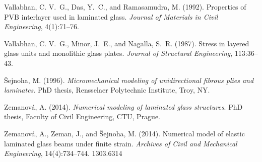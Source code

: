 \documentclass[11pt]{article}
\begin{document}
\begin{thebibliography}{10}
Vallabhan, C. V.~G., Das, Y.~C., and Ramasamudra, M. (1992).
Properties of {P}{V}{B} interlayer used in laminated glass.
{\em Journal of Materials in Civil Engineering}, 4(1):71--76.

Vallabhan, C. V.~G., Minor, J.~E., and Nagalla, S.~R. (1987).
Stress in layered glass units and monolithic glass plates.
{\em Journal of Structural Engineering}, 113:36--43.

\v{S}ejnoha, M. (1996).
{\em Micromechanical modeling of unidirectional fibrous plies and
  laminates}.
PhD thesis, Rensselaer Polytechnic Institute, Troy, NY.

Zemanov\'{a}, A. (2014).
{\em Numerical modeling of laminated glass structures}.
PhD thesis, Faculty of Civil Engineering, CTU, Prague.

Zemanov\'{a}, A., Zeman, J., and \v{S}ejnoha, M. (2014).
Numerical model of elastic laminated glass beams under finite strain.
{\em Archives of Civil and Mechanical Engineering}, 14(4):734--744. 1303.6314

\end{thebibliography}
\appendix
\end{document}
